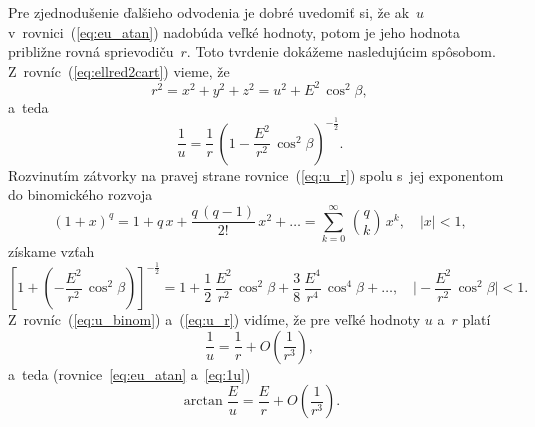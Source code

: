 \documentclass[a4paper, 12pt]{book}
\begin{document}
Pre zjednodušenie ďalšieho odvodenia je dobré uvedomiť si, že ak~$u$ 
v~rovnici~(\ref{eq:eu_atan}) nadobúda veľké hodnoty, potom je jeho hodnota 
približne rovná sprievodiču~$r$.  Toto tvrdenie dokážeme nasledujúcim spôsobom.  
Z~rovníc~(\ref{eq:ellred2cart}) vieme, že
%
\begin{equation}
r^2 = x^2 + y^2 + z^2 = u^2 + E^2 \, \cos^2\beta{,}
\end{equation}
%
a~teda
%
\begin{equation}
\label{eq:u_r}
\frac{1}{u} = \frac{1}{r} \, \left( 1 - \frac{E^2}{r^2} \, \cos^2\beta 
\right)^{-\frac{1}{2}}{.}
\end{equation}
%
Rozvinutím zátvorky na pravej strane rovnice~(\ref{eq:u_r}) spolu s~jej 
exponentom do binomického rozvoja \parencite[pozri napríklad][]{Gradshteyn2007}
%
\begin{equation}
(1 + x)^q = 1 + q \, x + \frac{q \, (q - 1)}{2!} \, x^2 + \dots = \sum_{k 
= 0}^{\infty} \, \binom{q}{k} \, x^k{,} \quad | x | < 1{,}
\end{equation}
%
získame vzťah
%
\begin{equation}
\label{eq:u_binom}
\left[ 1 + \left( - \frac{E^2}{r^2} \, \cos^2\beta \right) 
\right]^{-\frac{1}{2}} = 1 + \frac{1}{2} \, \frac{E^2}{r^2} \, \cos^2\beta 
+ \frac{3}{8} \, \frac{E^4}{r^4} \, \cos^4\beta + \dots{,} \quad \bigg\lvert 
-\frac{E^2}{r^2} \, \cos^2\beta \bigg\rvert < 1{.}
\end{equation}
%
Z~rovníc~(\ref{eq:u_binom}) a~(\ref{eq:u_r}) vidíme, že pre veľké hodnoty $u$ 
a~$r$ platí
%
\begin{equation}
\label{eq:1u}
\frac{1}{u} = \frac{1}{r} + O\left( \frac{1}{r^3} \right){,}
\end{equation}
%
a~teda (rovnice~\ref{eq:eu_atan} a~\ref{eq:1u})
%
\begin{equation}
\label{eq:arctan_eu_r}
\arctan\frac{E}{u} = \frac{E}{r} + O\left( \frac{1}{r^3} \right){.}
\end{equation}
\end{document}
